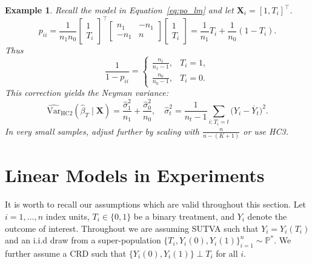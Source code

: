 \documentclass[11pt]{exam}
\theoremstyle{plain}
\newtheorem{example}{Example}
\newcommand{\bX}{\bm{X}}
\newcommand{\Var}{\mathrm{Var}}
\begin{document}
\begin{example}
  Recall the model in Equation~\eqref{eq:po_lm} and let $\bX_i = [1, T_i]^\top$. 
    \[
  p_{ii}
  = \frac{1}{n_1n_0}
    \begin{bmatrix}1\\T_i\end{bmatrix}^\top
    \begin{bmatrix}
      n_1 & -n_1 \\[3pt]
      -n_1 & n
    \end{bmatrix}
    \begin{bmatrix}1\\T_i\end{bmatrix}
  = \frac{1}{n_1}T_i + \frac{1}{n_0}(1-T_i).
  \]
  Thus
  \[
  \frac{1}{1-p_{ii}} =
  \begin{cases}
    \frac{n_1}{n_1-1}, & T_i=1,\\[4pt]
    \frac{n_0}{n_0-1}, & T_i=0.
  \end{cases}
  \]
  This correction yields the Neyman variance:
  \[
  \widehat{\Var}_{\mathrm{HC2}}(\hat{\beta}_T \mid \bX)
  = \frac{\hat{\sigma}_1^2}{n_1} + \frac{\hat{\sigma}_0^2}{n_0},
  \quad
  \hat{\sigma}_t^2 = \frac{1}{n_t-1}\sum_{i:T_i=t}\big(Y_i-\overline{Y}_t\big)^2.
  \]
  In very small samples, adjust further by scaling with $\tfrac{n}{n-(K+1)}$ or use \emph{HC3}.
\end{example}

\section{Linear Models in Experiments}
It is worth to recall our assumptions which are valid throughout this section. 
Let $i=1,\ldots,n$ index units, $T_i\in\{0,1\}$ be a binary treatment, and $Y_i$ denote the outcome of interest. Throughout we are assuming SUTVA such that $Y_i = Y_i(T_i)$ and an i.i.d draw from a super-population $\{T_i, Y_i(0), Y_i(1)\}_{i=1}^n \sim \mathbb{P}^\ast$. We further assume a CRD such that $\{Y_i(0), Y_i(1)\} \perp T_i$ for all $i$.
\end{document}

